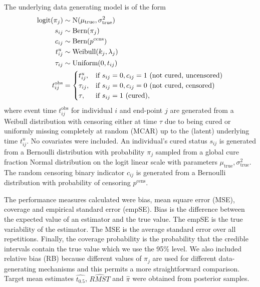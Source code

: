 \documentclass[AMA,STIX1COL]{WileyNJD-v2}
\begin{document}
The underlying data generating model is of the form
\begin{align}
    \notag
    \text{logit}(\pi_j) &\sim \text{N}(\mu_{\text{true}}, \sigma^2_{\text{true}}) \\
    \notag
    s_{ij} &\sim \text{Bern}(\pi_j)\\
    \notag
    c_{ij} &\sim \text{Bern}(p^{\text{cens}})\\
    \label{eqn:data-generation}
    t^{u}_{ij} &\sim \text{Weibull}(k_j, \lambda_j)\\
    \notag
    \tau_{ij} &\sim \text{Uniform}(0, t_{ij}) \\
    \notag
    t_{ij}^{\text{obs}} &= 
    \notag
    \begin{cases} 
    \notag
    t^{u}_{ij}, & \text{if } s_{ij} = 0, c_{ij} = 1 \text{ (not cured, uncensored)} \\
    \notag
    \tau_{ij}, & \text{if } s_{ij} = 0, c_{ij} = 0 \text{ (not cured, censored)} \\
    \notag
    \tau, & \text{if } s_{ij} = 1 \text{ (cured)},
    \notag
    \end{cases}
    \notag
\end{align}
where event time $t_{ij}^{\text{obs}}$ for individual $i$ and end-point $j$ are generated from a Weibull distribution with censoring either at time $\tau$ due to being cured or uniformly missing completely at random (MCAR) up to the (latent) underlying time $t^{u}_{ij}$. No covariates were included. An individual's cured status $s_{ij}$ is generated from a Bernoulli distribution with probability $\pi_j$ sampled from a global cure fraction Normal distribution on the logit linear scale with parameters $\mu_{\text{true}}, \sigma^2_{\text{true}}$. The random censoring binary indicator $c_{ij}$ is generated from a Bernoulli distribution with probability of censoring $p^{\text{cens}}$.

The performance measures calculated were bias, mean square error (MSE), coverage and empirical standard error (empSE).
Bias is the difference between the expected value of an estimator and the true value. The empSE is the true variability of the estimator. The MSE is the average standard error over all repetitions. Finally, the coverage probability is the probability that the credible intervals contain the true value which we use the 95\% level.
We also included relative bias (RB) because different values of $\pi_j$ are used for different data-generating mechanisms and this permits a more straightforward comparison.
Target mean estimates $\widehat{t_{0.5}}$, $\widehat{RMST}$ and $\widehat{\pi}$ were obtained from posterior samples.
\end{document}
